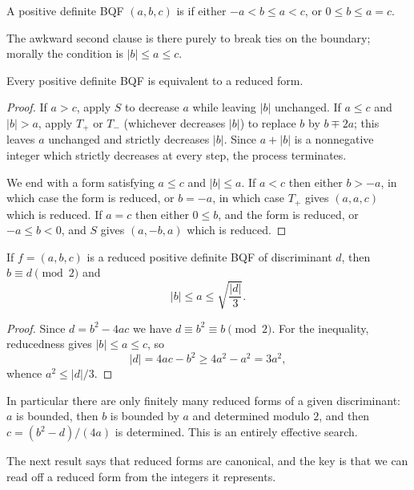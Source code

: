 \begin{definition}
	A positive definite BQF $(a,b,c)$ is  if either $-a < b \leq a < c$, or $0 \leq b \leq a = c$.
\end{definition}

The awkward second clause is there purely to break ties on the boundary; morally the condition is $|b| \leq a \leq c$.

\begin{proposition}
	Every positive definite BQF is equivalent to a reduced form.
\end{proposition}
\begin{proof}
	If $a > c$, apply $S$ to decrease $a$ while leaving $|b|$ unchanged. If $a \leq c$ and $|b| > a$, apply $T_+$ or $T_-$ (whichever decreases $|b|$) to replace $b$ by $b \mp 2a$; this leaves $a$ unchanged and strictly decreases $|b|$. Since $a + |b|$ is a nonnegative integer which strictly decreases at every step, the process terminates.

	We end with a form satisfying $a \leq c$ and $|b| \leq a$. If $a < c$ then either $b > -a$, in which case the form is reduced, or $b = -a$, in which case $T_+$ gives $(a, a, c)$ which is reduced. If $a = c$ then either $0 \leq b$, and the form is reduced, or $-a \leq b < 0$, and $S$ gives $(a, -b, a)$ which is reduced.
\end{proof}

\begin{lemma}\label{lem:redbound}
	If $f = (a,b,c)$ is a reduced positive definite BQF of discriminant $d$, then $b \equiv d \pmod 2$ and
	$$
	|b| \leq a \leq \sqrt{\frac{|d|}3}.
	$$
\end{lemma}
\begin{proof}
	Since $d = b^2 - 4ac$ we have $d \equiv b^2 \equiv b \pmod 2$. For the inequality, reducedness gives $|b| \leq a \leq c$, so
	$$
	|d| = 4ac - b^2 \geq 4a^2 - a^2 = 3a^2,
	$$
	whence $a^2 \leq |d|/3$.
\end{proof}

In particular there are only finitely many reduced forms of a given discriminant: $a$ is bounded, then $b$ is bounded by $a$ and determined modulo $2$, and then $c = (b^2 - d)/(4a)$ is determined. This is an entirely effective search.

The next result says that reduced forms are canonical, and the key is that we can read off a reduced form from the integers it represents.

